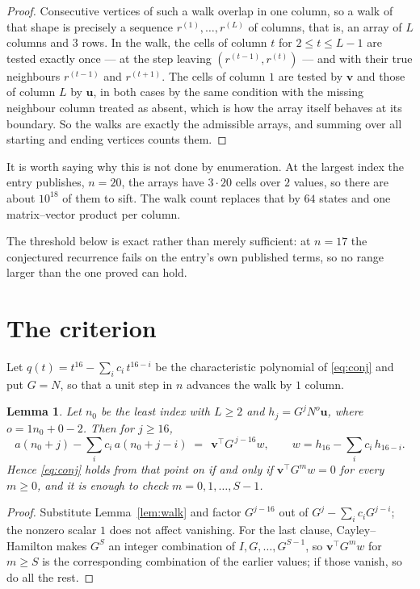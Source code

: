 \documentclass[11pt,a4paper]{article}
\theoremstyle{plain}
\newtheorem{lemma}[theorem]{Lemma}
\theoremstyle{definition}
\begin{document}
\begin{proof}
Consecutive vertices of such a walk overlap in one column, so a walk of that shape is
precisely a sequence $r^{(1)},\dots,r^{(L)}$ of columns, that is, an array of $L$ columns
and $3$ rows. In the walk, the cells of column $t$ for $2\le t\le L-1$ are tested
exactly once --- at the step leaving $(r^{(t-1)},r^{(t)})$ --- and with their true
neighbours $r^{(t-1)}$ and $r^{(t+1)}$. The cells of column $1$ are tested by
$\mathbf{v}$ and those of column $L$ by $\mathbf{u}$, in both cases by the same condition
with the missing neighbour column treated as absent, which is how the array itself behaves at
its boundary. So the walks are exactly the admissible arrays, and summing over all starting
and ending vertices counts them.
\end{proof}


It is worth saying why this is not done by enumeration. At the largest index the entry
publishes, $n=20$, the arrays have $3\cdot20$ cells over
$2$ values, so there are about $10^{18}$ of them to sift. The
walk count replaces that by $64$ states and one matrix--vector product per column.

The threshold below is exact rather than merely sufficient: at $n=17$ the conjectured
recurrence fails on the entry's own published terms, so no range larger than the one proved
can hold.
\section{The criterion}

Let $q(t)=t^{16}-\sum_i c_i\,t^{16-i}$ be the characteristic polynomial of
\eqref{eq:conj} and put $G=N$, so that a unit step in $n$ advances the walk by
$1$ column.

\begin{lemma}\label{lem:crit}
Let $n_0$ be the least index with $L\ge2$ and $h_j=G^{j}N^{o}\mathbf{u}$, where
$o=1n_0+0-2$. Then for $j\ge16$,
\[
a(n_0+j)-\sum_i c_i\,a(n_0+j-i)\;=\;\,\mathbf{v}^{\!\top}G^{\,j-16}w,
\qquad w=h_{16}-\sum_i c_i\,h_{16-i} .
\]
Hence \eqref{eq:conj} holds from that point on if and only if
$\mathbf{v}^{\!\top}G^{m}w=0$ for every $m\ge0$, and it is enough to check
$m=0,1,\dots,S-1$.
\end{lemma}

\begin{proof}
Substitute Lemma~\ref{lem:walk} and factor $G^{j-16}$ out of
$G^{j}-\sum_ic_iG^{j-i}$; the nonzero scalar $1$ does not affect
vanishing. For the last clause, Cayley--Hamilton makes $G^{S}$ an integer combination of
$I,G,\dots,G^{S-1}$, so $\mathbf{v}^{\!\top}G^{m}w$ for $m\ge S$ is the corresponding
combination of the earlier values; if those vanish, so do all the rest.
\end{proof}
\end{document}
